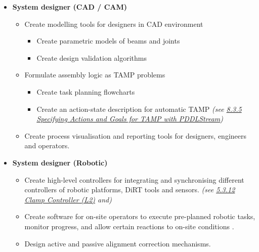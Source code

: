 \begin{itemize}
	\item \textbf{System designer (CAD / CAM)}

	\begin{itemize}
		\item Create modelling tools for designers in CAD environment 
		\begin{itemize}

			\item Create parametric models of beams and joints 

			\item Create design validation algorithms 

		\end{itemize}
		\item Formulate assembly logic as TAMP problems

		\begin{itemize}
			\item Create task planning flowcharts 
			\item Create an action-state description for automatic TAMP \textit{(see \ul{8.3.5 Specifying Actions and Goals for TAMP with PDDLStream})}

		\end{itemize}
		\item Create process visualisation and reporting tools for designers, engineers and operators. 

	\end{itemize}
	\item \textbf{System designer (Robotic)}

	\begin{itemize}
		\item Create high-level controllers for integrating and synchronising different controllers of robotic platforms, DiRT tools and sensors. \textit{(see \ul{5.3.12 Clamp Controller (L2)} and)}

		\item Create software for on-site operators to execute pre-planned robotic tasks, monitor progress, and allow certain reactions to on-site conditions .

		\item Design active and passive alignment correction mechanisms. 


\end{itemize}
\end{itemize}
